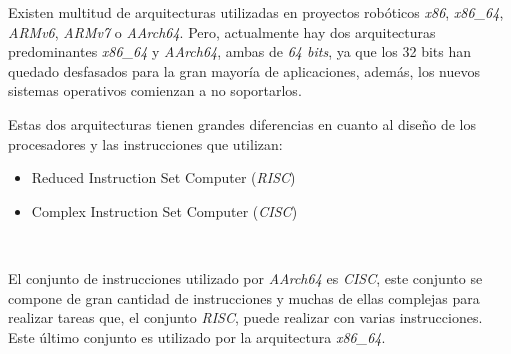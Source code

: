 Existen multitud de arquitecturas utilizadas en proyectos robóticos \textit{x86}, \textit{x86\_64}, \textit{ARMv6}, \textit{ARMv7} o \textit{AArch64}. Pero, actualmente hay dos arquitecturas predominantes \textit{x86\_64} y \textit{AArch64}, ambas de \textit{64 bits}, ya que los 32 bits han quedado desfasados para la gran mayoría de aplicaciones, además, los nuevos sistemas operativos comienzan a no soportarlos. \cite{canonical32bits}

Estas dos arquitecturas tienen grandes diferencias en cuanto al diseño de los procesadores y las instrucciones que utilizan:
\begin{itemize}
	\item Reduced Instruction Set Computer (\textit{RISC})
	\item Complex Instruction Set Computer (\textit{CISC})
\end{itemize}\

El conjunto de instrucciones utilizado por \textit{AArch64} es \textit{CISC}, este conjunto se compone de gran cantidad de instrucciones y muchas de ellas complejas para realizar tareas que, el conjunto \textit{RISC}, puede realizar con varias instrucciones. Este último conjunto es utilizado por la arquitectura \textit{x86\_64}.

